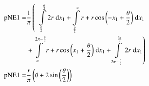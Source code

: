 \begin{align}
    \mathrm{pNE1} =&\frac{1}{\pi} \left(\;\;\int\limits_{\frac{\pi}{2}}^{\frac{\theta}{2}}2 r\;\mathrm{d}x_{1}+\int\limits_{\frac{\theta}{2}}^{\pi}r + r \cos{\left (- x_{1} + \frac{\theta}{2} \right )}\;\mathrm{d}x_{1}\right.\notag\\
 &\left.+\int\limits_{\pi}^{2 \pi - \frac{\theta}{2}}r + r \cos{\left (x_{1} + \frac{\theta}{2} \right )}\;\mathrm{d}x_{1}+\int\limits_{2 \pi - \frac{\theta}{2}}^{\frac{3 \pi}{2}}2 r\;\mathrm{d}x_{1}\right)\label{pNE1Def}\\
    \mathrm{pNE1} =& \frac{r}{\pi} \left(\theta + 2 \sin{\left (\frac{\theta}{2} \right )}\right)\label{pNE1Sln}
\end{align}